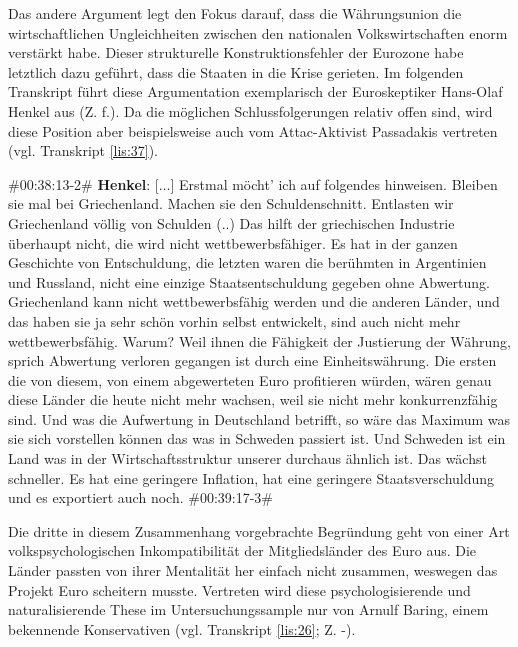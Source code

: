 Das andere Argument legt den Fokus darauf, dass die Währungsunion die wirtschaftlichen Ungleichheiten zwischen den nationalen Volkswirtschaften enorm verstärkt habe. Dieser strukturelle Konstruktionsfehler der Eurozone habe letztlich dazu geführt, dass die Staaten in die Krise gerieten. Im folgenden Transkript führt diese Argumentation exemplarisch der Euroskeptiker Hans-Olaf Henkel aus (Z. f.). Da die möglichen Schlussfolgerungen relativ offen sind, wird diese Position aber beispielsweise auch vom Attac-Aktivist Passadakis vertreten (vgl. Transkript \vref{lis:37}).

\begin{description}
	\begin{linenumbers}[1]
		\item \#00:38:13-2\# \textbf{Henkel}: [$\ldots$] Erstmal möcht' ich auf folgendes hinweisen. Bleiben sie mal bei Griechenland. Machen sie den Schuldenschnitt. Entlasten wir Griechenland völlig von Schulden (..) Das hilft der griechischen Industrie überhaupt nicht, die wird nicht wettbewerbsfähiger. Es hat in der ganzen Geschichte von Entschuldung, die letzten waren die berühmten in Argentinien und Russland, nicht eine einzige Staatsentschuldung gegeben ohne Abwertung. Griechenland kann nicht wettbewerbsfähig werden und die anderen Länder, und das haben sie ja sehr schön vorhin selbst entwickelt, sind auch nicht mehr wettbewerbsfähig. Warum? Weil ihnen die Fähigkeit der Justierung der Währung, sprich Abwertung verloren gegangen ist durch eine Einheitswährung. Die ersten die von diesem, von einem abgewerteten Euro profitieren würden, wären genau diese Länder die heute nicht mehr wachsen, weil sie nicht mehr konkurrenzfähig sind. Und was die Aufwertung in Deutschland betrifft, so wäre das Maximum was sie sich vorstellen können das was in Schweden passiert ist. Und Schweden ist ein Land was in der Wirtschaftsstruktur unserer durchaus ähnlich ist. Das wächst schneller. Es hat eine geringere Inflation, hat eine geringere Staatsverschuldung und es exportiert auch noch. \#00:39:17-3\# 
	\end{linenumbers}
\end{description}

Die dritte in diesem Zusammenhang vorgebrachte Begründung geht von einer Art volkspsychologischen Inkompatibilität der Mitgliedsländer des Euro aus. Die Länder passten von ihrer Mentalität her einfach nicht zusammen, weswegen das Projekt Euro scheitern musste. Vertreten wird diese psychologisierende und naturalisierende These im Untersuchungssample nur von Arnulf Baring, einem bekennende Konservativen (vgl. Transkript \vref{lis:26}; Z. -).

